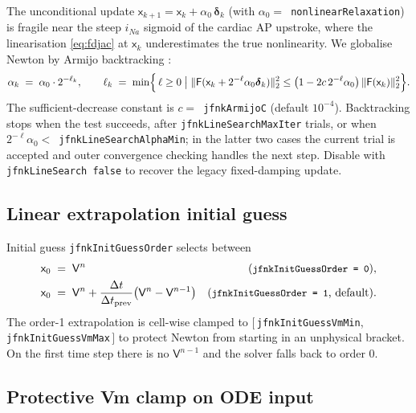 \documentclass[11pt,a4paper]{article}
\newcommand{\code}[1]{\texttt{\small #1}}
\begin{document}
The unconditional update $\mathsf{x}_{k+1} = \mathsf{x}_{k} +
\alpha_{0}\, \boldsymbol{\delta}_{k}$ (with $\alpha_{0} =
$~\code{nonlinearRelaxation}) is fragile near the steep $i_{Na}$
sigmoid of the cardiac AP upstroke, where the linearisation
\eqref{eq:fdjac} at $\mathsf{x}_{k}$ underestimates the true
nonlinearity. We globalise Newton by Armijo backtracking
\cite{noceWright}:
\begin{equation}
  \alpha_{k} \;=\; \alpha_{0} \cdot 2^{-\ell_{k}},
   \qquad
   \ell_{k} \;=\; \min\Bigl\{\, \ell \ge 0 \;\big|\;
       \lVert \mathsf{F}(\mathsf{x}_{k} + 2^{-\ell}\alpha_{0}
                          \boldsymbol{\delta}_{k}) \rVert_{2}^{2}
       \le \bigl(1 - 2c\, 2^{-\ell}\alpha_{0}\bigr)\,
           \lVert \mathsf{F}(\mathsf{x}_{k}) \rVert_{2}^{2}
       \Bigr\}.
   \label{eq:armijo}
\end{equation}
The sufficient-decrease constant is $c = $~\code{jfnkArmijoC}
(default $10^{-4}$). Backtracking stops when the test succeeds, after
\code{jfnkLineSearchMaxIter} trials, or when
$2^{-\ell}\alpha_{0} < $~\code{jfnkLineSearchAlphaMin}; in the latter
two cases the current trial is accepted and outer convergence
checking handles the next step. Disable with
\code{jfnkLineSearch~false} to recover the legacy fixed-damping update.

\subsection{Linear extrapolation initial guess}

Initial guess \code{jfnkInitGuessOrder} selects between
\begin{align}
  \mathsf{x}_{0} &\;=\; \mathsf{V}^{n}
       & \text{(\code{jfnkInitGuessOrder = 0})}, \\
  \mathsf{x}_{0} &\;=\; \mathsf{V}^{n} + \frac{\Delta t}{\Delta t_{\text{prev}}}
        \bigl( \mathsf{V}^{n} - \mathsf{V}^{n-1} \bigr)
       & \text{(\code{jfnkInitGuessOrder = 1}, default)}.
   \label{eq:extrap}
\end{align}
The order-1 extrapolation is cell-wise clamped to
$[\,$\code{jfnkInitGuessVmMin}, \code{jfnkInitGuessVmMax}$\,]$ to
protect Newton from starting in an unphysical bracket. On the first
time step there is no $\mathsf{V}^{n-1}$ and the solver falls back to
order 0.

\subsection{Protective Vm clamp on ODE input}
\end{document}
